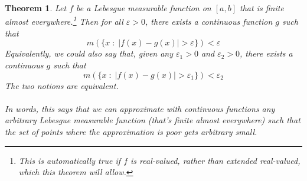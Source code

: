 \documentclass[12pt]{article}
\theoremstyle{plain}
\newtheorem{thm}{Theorem}[subsection]
\theoremstyle{definition}
\theoremstyle{remark}
\begin{document}
\begin{thm} 
\label{thm.contapprox}
Let $f$ be a Lebesgue measurable function on $[a,b]$ that is finite almost everywhere.\footnote{This is automatically true if $f$ is real-valued, rather than extended real-valued, which this theorem will allow.} Then for all $\varepsilon>0$, there exists a continuous function $g$ such that 
\begin{equation}
    \label{contapprox}
    m\left(\{x \; : \; |f(x)-g(x)|>\varepsilon\}\right)
    <\varepsilon
\end{equation}
Equivalently, we could also say that, given any $\varepsilon_1>0$ and $\varepsilon_2>0$, there exists a continuous $g$ such that 
\[
    m\left(\{x \; : \; |f(x)-g(x)|>\varepsilon_1\}\right)
    <\varepsilon_2
\]
The two notions are equivalent.
\\
\\
In words, this says that we can approximate with continuous functions any arbitrary Lebesgue measurable function (that's finite almost everywhere) such that the set of points where the approximation is poor gets arbitrary small. 
\end{thm}
\end{document}
